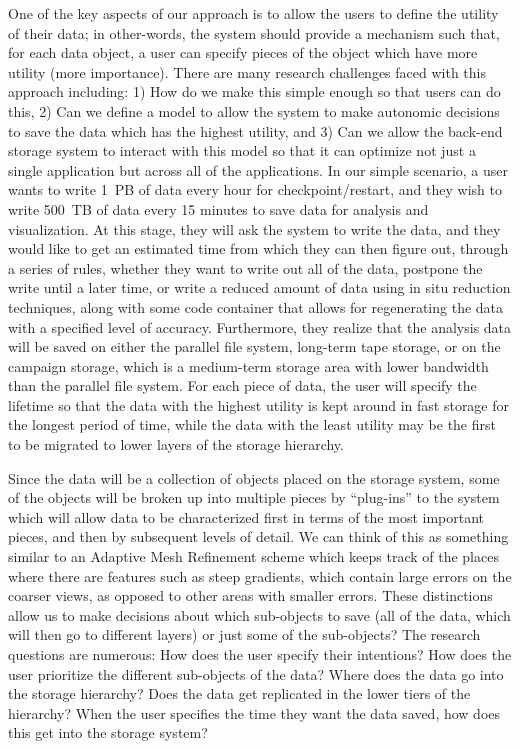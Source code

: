 One of the key aspects of our approach is to allow the users to define the
utility of their data; in other-words, the system should provide a
mechanism such that, for each data object, a user can specify pieces of the object
which have more utility (more importance).
There are many research challenges faced with
this approach including: 1) How do we make this simple enough so that users can
do this, 2) Can we define a model to allow the system to make
autonomic decisions to save the data which has the highest utility, and 3) Can
we allow the back-end storage system to interact with this model so that
it can optimize not just a single application but across all of the
applications.
  In our simple scenario, a user wants to write 1~PB of data every hour
for checkpoint/restart, and they wish to write 500~TB of data every 15
minutes to save data for analysis and visualization. At this stage, they will ask the system to
write the data, and they would like to get an estimated time from which they can
then figure out, through a series of rules, whether they want to write out all
of the data, postpone the write until a later time, or write a reduced amount
of data using in situ reduction techniques, along with some code
container that allows for regenerating the data with a specified level of
accuracy.  Furthermore, they realize that the analysis data will be saved on
either the parallel file system, long-term tape storage, or on the campaign storage,
which is a medium-term storage
area with lower bandwidth than the parallel file system.
For each piece of data, the user will specify the lifetime so
that the data with the highest utility is kept around in fast storage for the longest
period of time, while the data with the least utility may be the first to be migrated to
lower layers of the storage hierarchy. 

Since the data will be a collection of objects placed on the storage system,
some of the objects will be broken up into multiple pieces by ``plug-ins''
to the system which will allow data to be characterized first in terms of the most
important pieces, and then by subsequent levels of detail. We can think of this as
something similar to an Adaptive Mesh Refinement scheme which keeps track of
the places where there are features such as steep gradients, which contain large errors on the
coarser views, as opposed to other areas with smaller errors. These distinctions allow us to make decisions
about which sub-objects to save (all of the data, which will then go to
different layers) or just some of the sub-objects? The research questions
are numerous: How does the user specify their intentions? How does the user
prioritize the different sub-objects of the data? Where does the data go
into the storage hierarchy? Does the data get replicated in the lower tiers
of the hierarchy? When the user specifies the time they want the data saved,
how does this get into the storage system?

